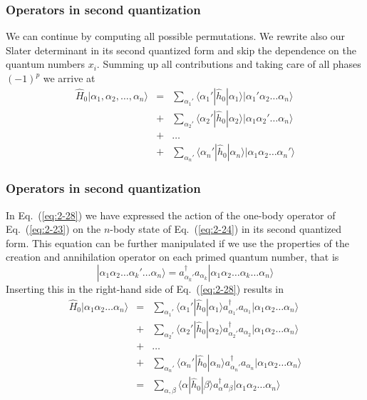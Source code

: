 \documentclass[compress]{beamer}
\newcommand*{\ket}[1]{|#1\rangle}
\newcommand*{\bra}[1]{\langle#1|}
\newcommand{\element}[3]
        {\bra{#1}#2\ket{#3}}
\begin{document}
\frame
{
  \frametitle{Operators in second quantization}
\begin{small}
{\scriptsize
We can continue by computing all possible permutations. 
We rewrite also our Slater determinant in its second quantized form and skip the dependence on the quantum numbers $x_i.$
Summing up all contributions and taking care of all phases
$(-1)^p$ we arrive at 
\begin{eqnarray}
	\hat{H}_0|\alpha_1,\alpha_2,\dots, \alpha_n\rangle &=& \sum_{\alpha_1'}\element{\alpha_1'}{\hat{h}_0}{\alpha_1}
		\ket{\alpha_1'\alpha_2 \dots \alpha_{n}} \nonumber \\
	&+& \sum_{\alpha_2'} \element{\alpha_2'}{\hat{h}_0}{\alpha_2}
		\ket{\alpha_1\alpha_2' \dots \alpha_{n}} \nonumber \\
	&+& \dots \nonumber \\
	&+& \sum_{\alpha_n'} \element{\alpha_n'}{\hat{h}_0}{\alpha_n}
		\ket{\alpha_1\alpha_2 \dots \alpha_{n}'} \label{eq:2-28}
\end{eqnarray}
}
\end{small}
}


\frame
{
  \frametitle{Operators in second quantization}
\begin{small}
{\scriptsize
In Eq.~(\ref{eq:2-28}) 
we have expressed the action of the one-body operator
of Eq.~(\ref{eq:2-23}) on the  $n$-body state of Eq.~(\ref{eq:2-24}) in its second quantized form.
This equation can be further manipulated if we use the properties of the creation and annihilation operator
on each primed quantum number, that is
\begin{equation}
	\ket{\alpha_1\alpha_2 \dots \alpha_k' \dots \alpha_{n}} = 
		a_{\alpha_k'}^\dagger  a_{\alpha_k} \ket{\alpha_1\alpha_2 \dots \alpha_k \dots \alpha_{n}} \label{eq:2-29}
\end{equation}
Inserting this in the right-hand side of Eq.~(\ref{eq:2-28}) results in
\begin{eqnarray}
	\hat{H}_0\ket{\alpha_1\alpha_2 \dots \alpha_{n}} &=& \sum_{\alpha_1'}\element{\alpha_1'}{\hat{h}_0}{\alpha_1}
		a_{\alpha_1'}^\dagger  a_{\alpha_1} \ket{\alpha_1\alpha_2 \dots \alpha_{n}} \nonumber \\
	&+& \sum_{\alpha_2'} \element{\alpha_2'}{\hat{h}_0}{\alpha_2}
		a_{\alpha_2'}^\dagger  a_{\alpha_2} \ket{\alpha_1\alpha_2 \dots \alpha_{n}} \nonumber \\
	&+& \dots \nonumber \\
	&+& \sum_{\alpha_n'} \element{\alpha_n'}{\hat{h}_0}{\alpha_n}
		a_{\alpha_n'}^\dagger  a_{\alpha_n} \ket{\alpha_1\alpha_2 \dots \alpha_{n}} \nonumber \\
	&=& \sum_{\alpha, \beta} \element{\alpha}{\hat{h}_0}{\beta} a_\alpha^\dagger a_\beta 
		\ket{\alpha_1\alpha_2 \dots \alpha_{n}} \label{eq:2-30a}
\end{eqnarray}
}
\end{small}
}
\end{document}
